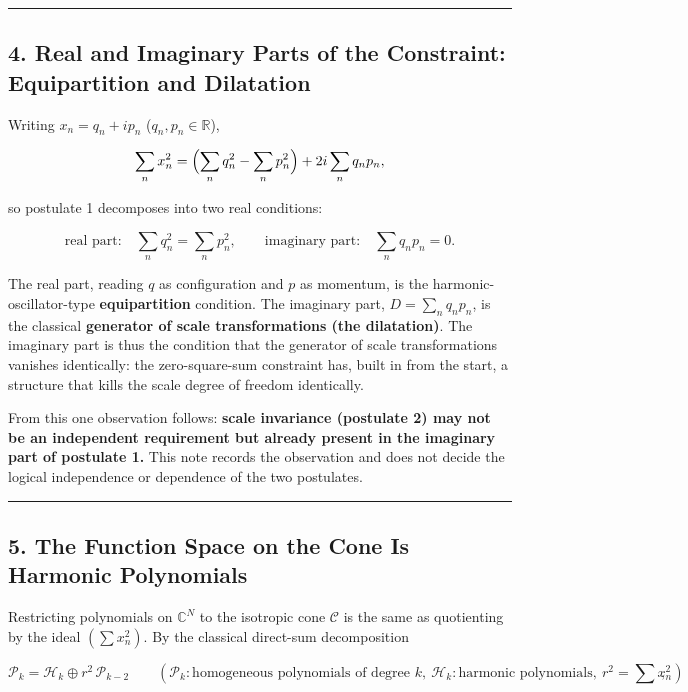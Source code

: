 \documentclass[
  a4paper,
]{article}
\begin{document}
\begin{center}\rule{0.5\linewidth}{0.5pt}\end{center}

\subsection{4. Real and Imaginary Parts of the Constraint: Equipartition
and
Dilatation}\label{real-and-imaginary-parts-of-the-constraint-equipartition-and-dilatation}

Writing \(x_n=q_n+ip_n\) (\(q_n,p_n\in\mathbb R\)),

\[
\sum_n x_n^2=\Bigl(\sum_n q_n^2-\sum_n p_n^2\Bigr)+2i\sum_n q_np_n,
\]

so postulate 1 decomposes into two real conditions:

\[
\text{real part:}\quad \sum_n q_n^2=\sum_n p_n^2,
\qquad
\text{imaginary part:}\quad \sum_n q_np_n=0.
\]

The real part, reading \(q\) as configuration and \(p\) as momentum, is
the harmonic-oscillator-type \textbf{equipartition} condition. The
imaginary part, \(D=\sum_n q_np_n\), is the classical \textbf{generator
of scale transformations (the dilatation)}. The imaginary part is thus
the condition that the generator of scale transformations vanishes
identically: the zero-square-sum constraint has, built in from the
start, a structure that kills the scale degree of freedom identically.

From this one observation follows: \textbf{scale invariance (postulate
2) may not be an independent requirement but already present in the
imaginary part of postulate 1.} This note records the observation and
does not decide the logical independence or dependence of the two
postulates.

\begin{center}\rule{0.5\linewidth}{0.5pt}\end{center}

\subsection{5. The Function Space on the Cone Is Harmonic
Polynomials}\label{the-function-space-on-the-cone-is-harmonic-polynomials}

Restricting polynomials on \(\mathbb C^N\) to the isotropic cone
\(\mathcal C\) is the same as quotienting by the ideal \((\sum x_n^2)\).
By the classical direct-sum decomposition

\[
\mathcal P_k=\mathcal H_k\oplus r^2\,\mathcal P_{k-2}
\qquad(\mathcal P_k:\text{homogeneous polynomials of degree }k,\ \mathcal H_k:\text{harmonic polynomials},\ r^2=\textstyle\sum x_n^2),
\]
\end{document}
